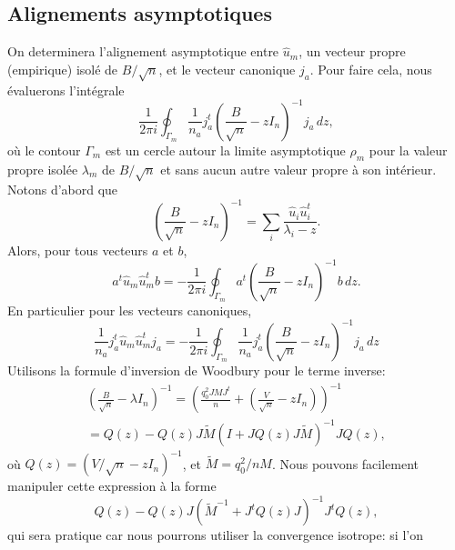 \documentclass[../../main.tex]{subfiles} %
\begin{document}
\subsection{Alignements asymptotiques}
On determinera l'alignement asymptotique entre $\hat{u}_m$, un vecteur propre 
(empirique) isolé de $B / \sqrt n$, et le vecteur canonique $j_a$. Pour faire 
cela, nous évaluerons l'intégrale
\begin{equation*}
	\frac{1}{2 \pi i} \oint_{\Gamma_m} \frac{1}{n_a} j_a^t 
	\left( \frac{B}{\sqrt n} - z I_n \right)^{-1} j_a \, dz,
\end{equation*}
où le contour $\Gamma_m$ est un cercle autour la limite asymptotique $\rho_m$ 
pour la valeur propre isolée $\lambda_m$ de $B / \sqrt n$ et sans aucun autre 
valeur propre à son intérieur. Notons d'abord que
\begin{equation*}
	\left( \frac{B}{\sqrt n} - z I_n \right)^{-1} = \sum_i \frac{\hat{u}_i 
	\hat{u}_i^t}{\lambda_i - z}.
\end{equation*}
Alors, pour tous vecteurs $a$ et $b$,
\begin{equation*}
	a^t \hat{u}_m \hat{u}_m^t b = - \frac{1}{2 \pi i} \oint_{\Gamma_m} a^t 
	\left( \frac{B}{\sqrt n} - z I_n \right)^{-1} b \, dz.
\end{equation*}
En particulier pour les vecteurs canoniques,
\begin{equation*}
	\frac{1}{n_a} j_a^t \hat{u}_m \hat{u}_m^t j_a = -\frac{1}{2 \pi i} 
	\oint_{\Gamma_m} \frac{1}{n_a} j_a^t \left( \frac{B}{\sqrt n} - z I_n 
	\right)^{-1} j_a \, dz
\end{equation*}
Utilisons la formule d'inversion de Woodbury pour le terme inverse:
\begin{equation*}
\begin{gathered}
	\left( \frac{B}{\sqrt n} - \lambda I_n \right)^{-1} 
	= \left(\frac{q_0^2 J M J^t}{n} 
	+ \left( \frac{V}{\sqrt n} - z I_n \right) \right)^{-1} \\
	= Q(z) - Q(z) J \tilde M \left( I + J Q(z) J \tilde M \right)^{-1} 
	J Q(z),
\end{gathered}
\end{equation*}
où $Q(z) = \left(V / \sqrt n - z I_n \right)^{-1}$, et $\tilde M = q_0^2 / n M$.
Nous pouvons facilement manipuler cette expression à la forme
\begin{equation*}
	Q(z) - Q(z) J \left( \tilde M^{-1} + J^t Q(z) J \right)^{-1} J^t Q(z),
\end{equation*}
qui sera pratique car nous pourrons utiliser la convergence isotrope: si l'on 
\end{document}

